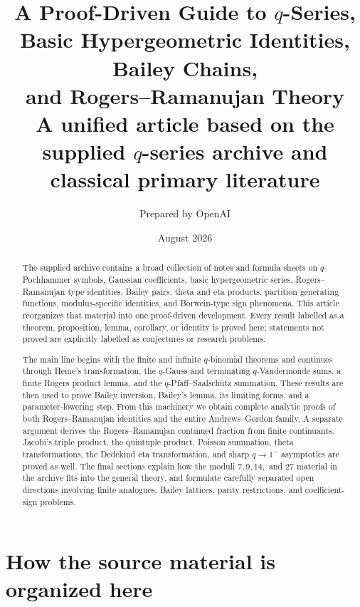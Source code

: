 \documentclass[11pt]{article}
\title{\textbf{A Proof-Driven Guide to $q$-Series,\\Basic Hypergeometric Identities, Bailey Chains,\\and Rogers--Ramanujan Theory}\\[0.7em]
\large A unified article based on the supplied $q$-series archive and classical primary literature}
\author{Prepared by OpenAI}
\date{August 2026}
\numberwithin{equation}{section}
\theoremstyle{definition}
\theoremstyle{remark}
\begin{document}
\maketitle

\begin{abstract}
The supplied archive contains a broad collection of notes and formula sheets on
$q$-Pochhammer symbols, Gaussian coefficients, basic hypergeometric series,
Rogers--Ramanujan type identities, Bailey pairs, theta and eta products,
partition generating functions, modulus-specific identities, and
Borwein-type sign phenomena.  This article reorganizes that material into one
proof-driven development.  Every result labelled as a theorem, proposition,
lemma, corollary, or identity is proved here; statements not proved are
explicitly labelled as conjectures or research problems.

The main line begins with the finite and infinite $q$-binomial theorems and
continues through Heine's transformation, the $q$-Gauss and terminating
$q$-Vandermonde sums, a finite Rogers product lemma, and the
$q$-Pfaff--Saalsch\"utz summation.  These results are then used to prove
Bailey inversion, Bailey's lemma, its limiting forms, and a parameter-lowering
step.  From this machinery we obtain complete analytic proofs of both
Rogers--Ramanujan identities and the entire Andrews--Gordon family.  A separate
argument derives the Rogers--Ramanujan continued fraction from finite
continuants.  Jacobi's triple product, the quintuple product, Poisson summation,
theta transformations, the Dedekind eta transformation, and sharp
$q\to1^-$ asymptotics are proved as well.  The final sections explain how the
moduli $7,9,14,$ and $27$ material in the archive fits into the general theory,
and formulate carefully separated open directions involving finite analogues,
Bailey lattices, parity restrictions, and coefficient-sign problems.
\end{abstract}

\tableofcontents
\newpage

\section{How the source material is organized here}
\end{document}
